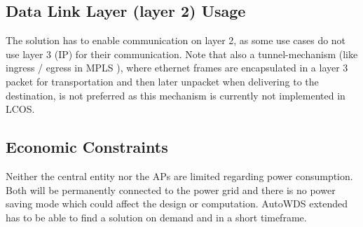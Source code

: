     \subsection{Data Link Layer (layer 2) Usage}
      The solution has to enable communication on layer 2, as some use cases do not use layer 3 (\ac{IP}) for their communication.
      Note that also a tunnel-mechanism (like ingress / egress in \ac{MPLS} \cite{mpls}), 
      where ethernet frames are encapsulated in a layer 3 packet for transportation and then later unpacket when delivering to the destination,
      is not preferred as this mechanism is currently not implemented in \ac{LCOS}.
    
    \subsection{Economic Constraints}
      Neither the central entity nor the APs are limited regarding power consumption. 
      Both will be permanently connected to the power grid and there is no power saving mode which could affect the design or computation.
      AutoWDS extended has to be able to find a solution on demand and in a short timeframe.
  